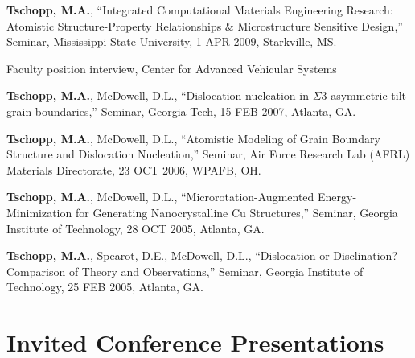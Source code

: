 \begin{cvlist}
\item
\textbf{Tschopp, M.A.}, ``Integrated Computational Materials Engineering Research: Atomistic Structure-Property Relationships \& Microstructure Sensitive Design,'' Seminar, Mississippi State University, 1 APR 2009, Starkville, MS.
\begin{list2}
\item[$\star$] Faculty position interview, Center for Advanced Vehicular Systems
\end{list2}

\item
\textbf{Tschopp, M.A.}, McDowell, D.L., ``Dislocation nucleation in $\Sigma3$ asymmetric tilt grain boundaries,'' Seminar, Georgia Tech, 15 FEB 2007, Atlanta, GA.

\item
\textbf{Tschopp, M.A.}, McDowell, D.L., ``Atomistic Modeling of Grain Boundary Structure and Dislocation Nucleation,'' Seminar, Air Force Research Lab (AFRL) Materials Directorate, 23 OCT 2006, WPAFB, OH.

\item
\textbf{Tschopp, M.A.}, McDowell, D.L., ``Microrotation-Augmented Energy-Minimization for Generating Nanocrystalline Cu Structures,''  Seminar, Georgia Institute of Technology, 28 OCT 2005, Atlanta, GA.

\item
\textbf{Tschopp, M.A.}, Spearot, D.E., McDowell, D.L., ``Dislocation or Disclination? Comparison of Theory and Observations,''  Seminar, Georgia Institute of Technology, 25 FEB 2005, Atlanta, GA.

\end{cvlist}

\section{\sc Invited Conference Presentations}

